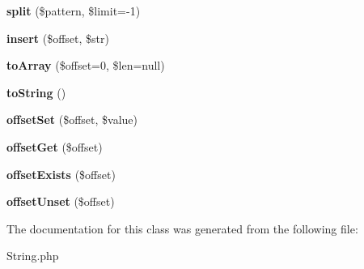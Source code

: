 \begin{DoxyCompactItemize}
\item 
\hypertarget{classString_af1ceaa53461e40a69de4f14a115d7d56}{
{\bfseries split} (\$pattern, \$limit=-\/1)}
\label{classString_af1ceaa53461e40a69de4f14a115d7d56}

\item 
\hypertarget{classString_abe7d7e1e2b57ab7dcd01d8e2d1d53148}{
{\bfseries insert} (\$offset, \$str)}
\label{classString_abe7d7e1e2b57ab7dcd01d8e2d1d53148}

\item 
\hypertarget{classString_abacf7b1614b42312f4f49ca064980139}{
{\bfseries toArray} (\$offset=0, \$len=null)}
\label{classString_abacf7b1614b42312f4f49ca064980139}

\item 
\hypertarget{classString_aa7ef98a0c1a4b8b375baf8791e7b773c}{
{\bfseries toString} ()}
\label{classString_aa7ef98a0c1a4b8b375baf8791e7b773c}

\item 
\hypertarget{classString_a6a17056cddb17560a093b846c6168537}{
{\bfseries offsetSet} (\$offset, \$value)}
\label{classString_a6a17056cddb17560a093b846c6168537}

\item 
\hypertarget{classString_a4627964e8bc80f485b4b7c1b1c609820}{
{\bfseries offsetGet} (\$offset)}
\label{classString_a4627964e8bc80f485b4b7c1b1c609820}

\item 
\hypertarget{classString_a0ad487f2acca3753cd9d42cf9325225e}{
{\bfseries offsetExists} (\$offset)}
\label{classString_a0ad487f2acca3753cd9d42cf9325225e}

\item 
\hypertarget{classString_af12691beca61c36ac057a8515b2f4bfe}{
{\bfseries offsetUnset} (\$offset)}
\label{classString_af12691beca61c36ac057a8515b2f4bfe}

\end{DoxyCompactItemize}


The documentation for this class was generated from the following file:\begin{DoxyCompactItemize}
\item 
String.php\end{DoxyCompactItemize}
